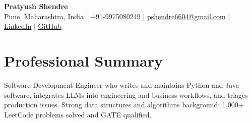 \documentclass[a4paper,11pt]{article}
\begin{document}
\begin{center}
  {\Large\bfseries Pratyush Shendre}\\[2pt]
  \small Pune, Maharashtra, India $|$ +91-9975080249 $|$
  \href{mailto:pshendre6604@gmail.com}{pshendre6604@gmail.com} $|$
  \href{https://www.linkedin.com/in/pratyush-shendre-2256a7223/}{\underline{LinkedIn}} $|$
  \href{https://github.com/PratyushS04}{\underline{GitHub}}
\end{center}

\section{Professional Summary}
\small Software Development Engineer who writes and maintains Python and Java software, integrates LLMs into engineering and business workf{}lows, and triages production issues. Strong data structures and algorithms background: 1,000+ LeetCode problems solved and GATE qualif{}ied.
\end{document}
